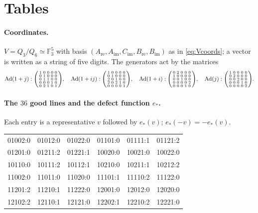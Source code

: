 \documentclass[11pt]{article}
\newcommand{\Fq}{\mathbb F}
\newcommand{\Ad}{\operatorname{Ad}}
\theoremstyle{plain}
\theoremstyle{definition}
\begin{document}
\appendix
\section{Tables}\label{app:tables}
\paragraph{Coordinates.}  $V=Q_3/Q_6\simeq\Fq_3^5$ with basis
$(A_{\mathrm{re}},A_{\mathrm{im}},C_{\mathrm{im}},B_{\mathrm{re}},B_{\mathrm{im}})$
as in \eqref{eq:Vcoords}; a vector is written as a string of five
digits.  The generators act by the matrices
\[
\Ad(1+j):\begin{psmallmatrix}1&0&0&0&0\\0&1&0&0&0\\0&1&1&0&0\\0&0&0&1&0\\0&2&1&0&1\end{psmallmatrix},\quad
\Ad(1+ij):\begin{psmallmatrix}1&0&0&0&0\\0&1&0&0&0\\2&0&1&0&0\\2&0&2&1&0\\0&0&0&0&1\end{psmallmatrix},\quad
\Ad(1+i):\begin{psmallmatrix}0&2&0&0&0\\1&0&0&0&0\\0&0&1&0&0\\0&0&0&0&2\\0&0&0&1&0\end{psmallmatrix},\quad
\Ad(j):\begin{psmallmatrix}1&0&0&0&0\\0&2&0&0&0\\0&0&2&0&0\\0&0&0&1&0\\0&0&0&0&2\end{psmallmatrix}.
\]
\paragraph{The $36$ good lines and the defect function $e_*$.}
Each entry is a representative $v$ followed by $e_*(v)$; $e_*(-v)=-e_*(v)$.
\begin{center}\small\ttfamily
\begin{tabular}{llllll}
01002:0&01012:0&01022:0&01101:0&01111:1&01121:2\\
01201:0&01211:2&01221:1&10020:0&10021:0&10022:0\\
10110:0&10111:2&10112:1&10210:0&10211:1&10212:2\\
11002:0&11011:0&11020:0&11101:1&11110:2&11122:0\\
11201:2&11210:1&11222:0&12001:0&12012:0&12020:0\\
12102:2&12110:1&12121:0&12202:1&12210:2&12221:0\\
\end{tabular}
\end{center}
\end{document}
